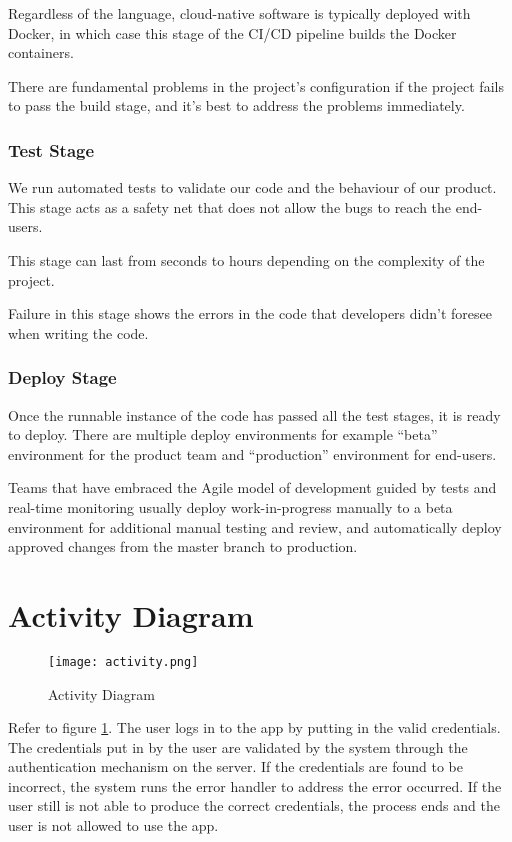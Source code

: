 Regardless of the language, cloud-native software is typically deployed with Docker, in which case this 
stage of the CI/CD pipeline builds the Docker containers.

There are fundamental problems in the project's configuration if the project fails to pass the build 
stage, and it’s best to address the problems immediately.

\subsubsection{Test Stage}
We run automated tests to validate our code and the behaviour of our product. This stage acts as a safety
net that does not allow the bugs to reach the end-users.

This stage can last from seconds to  hours depending on the complexity of the project.

Failure in this stage shows the errors in the code that developers didn't foresee when writing the code.

\subsubsection{Deploy Stage}
Once the runnable instance of the code has passed all the test stages, it is ready to deploy. There are 
multiple deploy environments for example “beta” environment for the product team and “production” 
environment for end-users.

Teams that have embraced the Agile model of development guided by tests and real-time monitoring usually 
deploy work-in-progress manually to a beta environment for additional manual testing and review, and 
automatically deploy approved changes from the master branch to production.



\section{Activity Diagram}

\begin{figure}[h!]
    \begin{center}
        \texttt{[image: activity.png]}
    \end{center}
    \caption{Activity Diagram}
    \label{fig:activity}
\end{figure}

Refer to figure \ref{fig:activity}. The user logs in to the app by putting in the valid credentials.
The credentials put in by the user are validated by the system through the authentication mechanism on the server.
If the credentials are found to be incorrect, the system runs the error handler to address the error occurred.
If the user still is not able to produce the correct credentials, the process ends and the user is not allowed to use the app.

